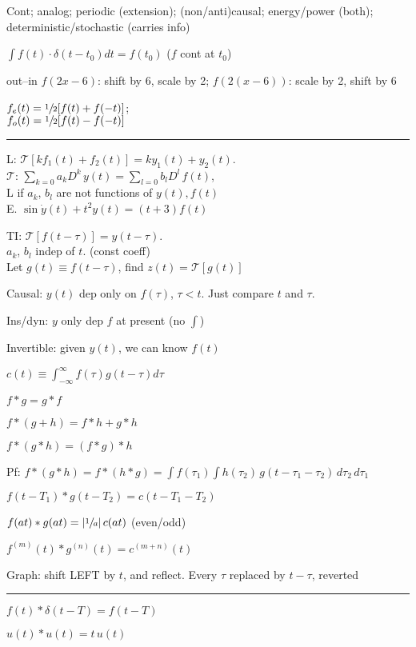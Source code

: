 \documentclass[6pt]{article}
\theoremstyle{definition}
\theoremstyle{definition}
\begin{document}
\begin{multicols*}{3}
    Cont; 
    analog; 
    periodic (extension); 
    (non/anti)causal; 
    energy/power (both); 
    deterministic/stochastic (carries info)

    $\int f(t)\cdot \delta(t - t_0) dt = f(t_0)$ ($f$ cont at $t_0$)
    

    out--in  $f(2x-6)$: shift by 6, scale by 2; $f(2(x-6))$: scale by 2, shift by 6

    $f_e(t) = \sfrac{1}{2}[f(t) + f(-t)]$; \\
    $f_o(t) = \sfrac{1}{2}[f(t) - f(-t)]$
\rule{\linewidth}{0.5pt}
    L: $\mathcal{T}[kf_1(t) + f_2(t)] = ky_1(t) + y_2(t)$.\\
    $\mathcal{T}$: $\sum_{k=0}a_k D^k \, y(t) = \sum_{l=0}b_lD^l\, f(t)$,\\
    L if $a_k$, $b_l$ are not functions of $y(t), f(t)$\\
    E. $\sin\dot{y}(t) + t^2 y(t) = (t+3) f(t)$
    
    TI: $\mathcal{T}[f(t-\tau)] = y(t-\tau)$.\\
    $a_k$, $b_l$ indep of $t$. (const coeff)\\
    Let $g(t)\equiv f(t-\tau)$, find $z(t) = \mathcal{T}[g(t)]$


    Causal: $y(t)$ dep only on $f(\tau)$, $\tau < t$. 
    Just compare $t$ and $\tau$.
    
    Ins/dyn: $y$ only dep $f$ at present (no $\int$)
    
    Invertible: given $y(t)$, we can know $f(t)$

    $c(t) \equiv \int_{-\infty}^{\infty} f(\tau) g(t-\tau) d\tau$

    $f * g = g * f$
    
    $f * (g + h) = f * h + g * h$
    
    $f * (g * h) = (f * g) * h$

        Pf: $f * (g * h) = f * (h * g) = \int f(\tau_1) \int h(\tau_2)\, g(t - \tau_1 - \tau_2) \, d\tau_2 \, d\tau_1$
    
     $f(t - T_1) * g(t - T_2) = c(t - T_1 - T_2)$

     $f(at) * g(at) = |\sfrac{1}{a}|\, c(at)$ (even/odd)

     $f^{(m)} (t) * g^{(n)} (t) = c^{(m+n)}(t)$


    Graph: shift LEFT by $t$, and reflect. Every $\tau$ replaced by $t-\tau$, reverted
\rule{\linewidth}{0.5pt}
    $f(t) * \delta(t-T) = f(t-T)$
    
    $u(t) * u(t) = t \, u(t)$


\end{multicols*}
\end{document}

